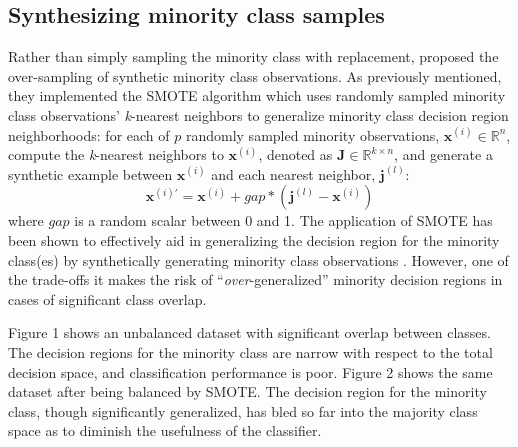 \documentclass[twoside,11pt]{article}
\begin{document}
\subsection{Synthesizing minority class samples}

Rather than simply sampling the minority class with replacement, \cite{chawla2002smote} proposed the over-sampling of synthetic minority class observations.  As previously mentioned, they implemented the SMOTE algorithm which uses randomly sampled minority class observations' \emph{k}-nearest neighbors to generalize minority class decision region neighborhoods: for each of $p$ randomly sampled minority observations, $\mathbf{x}^{(i)} \in \mathbb{R}^{n}$, compute the \emph{k}-nearest neighbors to $\mathbf{x}^{(i)}$, denoted as $\mathbf{J} \in \mathbb{R}^{k \times n}$, and generate a synthetic example between $\mathbf{x}^{(i)}$ and each nearest neighbor, $\mathbf{j}^{(l)}$:
\[
    \mathbf{x}^{(i)\prime} = \mathbf{x}^{(i)} + gap * (\mathbf{j}^{(l)} - \mathbf{x}^{(i)})
\]
where $gap$ is a random scalar between 0 and 1. The application of SMOTE has been shown to effectively aid in generalizing the decision region for the minority class(es) by synthetically generating minority class observations \citep*{chawla2002smote}. However, one of the trade-offs it makes the risk of ``\emph{over}-generalized'' minority decision regions in cases of significant class overlap.

Figure 1 shows an unbalanced dataset with significant overlap between classes. The decision regions for the minority class are narrow with respect to the total decision space, and classification performance is poor. Figure 2 shows the same dataset after being balanced by SMOTE. The decision region for the minority class, though significantly generalized, has bled so far into the majority class space as to diminish the usefulness of the classifier.

\end{document}
